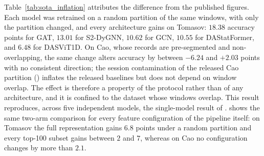 Table~\ref{tab:sota_inflation} attributes the difference from the published figures. Each model was retrained on a random partition of the same windows, with only the partition changed, and every architecture gains on Tomasov: $18.38$ accuracy points for GAT, $13.01$ for S2-DyGNN, $10.62$ for GCN, $10.55$ for DAStatFormer, and $6.48$ for DASViT1D. On Cao, whose records are pre-segmented and non-overlapping, the same change alters accuracy by between $-6.24$ and $+2.03$ points with no consistent direction; the session contamination of the released Cao partition () inflates the released baselines but does not depend on window overlap. The effect is therefore a property of the protocol rather than of any architecture, and it is confined to the dataset whose windows overlap. This result reproduces, across five independent models, the single-model result of .  shows the same two-arm comparison for every feature configuration of the pipeline itself: on Tomasov the full representation gains $6.8$ points under a random partition and every top-100 subset gains between $2$ and $7$, whereas on Cao no configuration changes by more than $2.1$.

\begin{table}[!htbp]
	\centering
	\caption{Protocol sensitivity of each architecture on the Tomasov and Cao datasets. The same model is retrained on a random partition of the same windows, changing only the partition. Values are test accuracy (\%).}
	\label{tab:sota_inflation}
	\small
\end{table}

